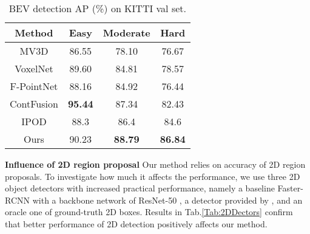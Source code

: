\documentclass[letterpaper, 10 pt, conference]{ieeeconf}
\begin{document}
\begin{table}
	\begin{center}
		\begin{tabular}{c|ccc}
			\hline
			Method                          & Easy           & Moderate       & Hard           \\ \hline
			MV3D\cite{chen2017multi}        & 86.55          & 78.10          & 76.67          \\
			VoxelNet\cite{zhou2018voxelnet} & 89.60          & 84.81          & 78.57          \\
			F-PointNet\cite{qi2018frustum}  & 88.16          & 84.92          & 76.44          \\
			ContFusion\cite{liang2018deep}  & \textbf{95.44} & 87.34          & 82.43          \\
			IPOD \cite{yang2018ipod}        & 88.3           & 86.4           & 84.6           \\ \hline
			Ours                            & 90.23          & \textbf{88.79} & \textbf{86.84} \\ \hline
		\end{tabular}
		\caption{BEV detection AP (\%) on KITTI val set.}
		\label{Tab:KITTI_VAL_BEV}
	\end{center}
\vspace{-0.5cm}
\end{table}

\vspace{0.1cm}
\noindent\textbf{Influence of 2D region proposal} Our method relies on accuracy of 2D region proposals. To investigate how much it affects the performance, we use three 2D object detectors with increased practical performance, namely a baseline Faster-RCNN \cite{ren2015faster} with a backbone network of ResNet-50 \cite{he2016deep}, a detector provided by \cite{qi2018frustum}, and an oracle one of ground-truth 2D boxes. Results in Tab.\ref{Tab:2DDectors} confirm that better performance of 2D detection positively affects our method.
\end{document}
